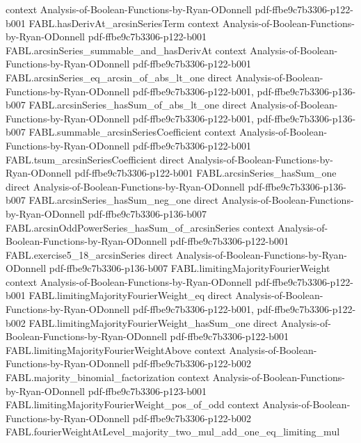 \begin{theorem}
  {context}
  {Analysis-of-Boolean-Functions-by-Ryan-ODonnell}
  {pdf-ffbe9c7b3306-p122-b001}
\proofstep
  {FABL.hasDerivAt_arcsinSeriesTerm}
  {context}
  {Analysis-of-Boolean-Functions-by-Ryan-ODonnell}
  {pdf-ffbe9c7b3306-p122-b001}
\proofstep
  {FABL.arcsinSeries_summable_and_hasDerivAt}
  {context}
  {Analysis-of-Boolean-Functions-by-Ryan-ODonnell}
  {pdf-ffbe9c7b3306-p122-b001}
\proofstep
  {FABL.arcsinSeries_eq_arcsin_of_abs_lt_one}
  {direct}
  {Analysis-of-Boolean-Functions-by-Ryan-ODonnell}
  {pdf-ffbe9c7b3306-p122-b001,
    pdf-ffbe9c7b3306-p136-b007}
\proofstep
  {FABL.arcsinSeries_hasSum_of_abs_lt_one}
  {direct}
  {Analysis-of-Boolean-Functions-by-Ryan-ODonnell}
  {pdf-ffbe9c7b3306-p122-b001,
    pdf-ffbe9c7b3306-p136-b007}
\proofstep
  {FABL.summable_arcsinSeriesCoefficient}
  {context}
  {Analysis-of-Boolean-Functions-by-Ryan-ODonnell}
  {pdf-ffbe9c7b3306-p122-b001}
\proofstep
  {FABL.tsum_arcsinSeriesCoefficient}
  {direct}
  {Analysis-of-Boolean-Functions-by-Ryan-ODonnell}
  {pdf-ffbe9c7b3306-p122-b001}
\proofstep
  {FABL.arcsinSeries_hasSum_one}
  {direct}
  {Analysis-of-Boolean-Functions-by-Ryan-ODonnell}
  {pdf-ffbe9c7b3306-p136-b007}
\proofstep
  {FABL.arcsinSeries_hasSum_neg_one}
  {direct}
  {Analysis-of-Boolean-Functions-by-Ryan-ODonnell}
  {pdf-ffbe9c7b3306-p136-b007}
\proofstep
  {FABL.arcsinOddPowerSeries_hasSum_of_arcsinSeries}
  {context}
  {Analysis-of-Boolean-Functions-by-Ryan-ODonnell}
  {pdf-ffbe9c7b3306-p122-b001}
\proofstep
  {FABL.exercise5_18_arcsinSeries}
  {direct}
  {Analysis-of-Boolean-Functions-by-Ryan-ODonnell}
  {pdf-ffbe9c7b3306-p136-b007}
\proofstep
  {FABL.limitingMajorityFourierWeight}
  {context}
  {Analysis-of-Boolean-Functions-by-Ryan-ODonnell}
  {pdf-ffbe9c7b3306-p122-b001}
\proofstep
  {FABL.limitingMajorityFourierWeight_eq}
  {direct}
  {Analysis-of-Boolean-Functions-by-Ryan-ODonnell}
  {pdf-ffbe9c7b3306-p122-b001,
    pdf-ffbe9c7b3306-p122-b002}
\proofstep
  {FABL.limitingMajorityFourierWeight_hasSum_one}
  {direct}
  {Analysis-of-Boolean-Functions-by-Ryan-ODonnell}
  {pdf-ffbe9c7b3306-p122-b001}
\proofstep
  {FABL.limitingMajorityFourierWeightAbove}
  {context}
  {Analysis-of-Boolean-Functions-by-Ryan-ODonnell}
  {pdf-ffbe9c7b3306-p122-b002}
\proofstep
  {FABL.majority_binomial_factorization}
  {context}
  {Analysis-of-Boolean-Functions-by-Ryan-ODonnell}
  {pdf-ffbe9c7b3306-p123-b001}
\proofstep
  {FABL.limitingMajorityFourierWeight_pos_of_odd}
  {context}
  {Analysis-of-Boolean-Functions-by-Ryan-ODonnell}
  {pdf-ffbe9c7b3306-p122-b002}
\proofstep
  {FABL.fourierWeightAtLevel_majority_two_mul_add_one_eq_limiting_mul}

\end{theorem}
